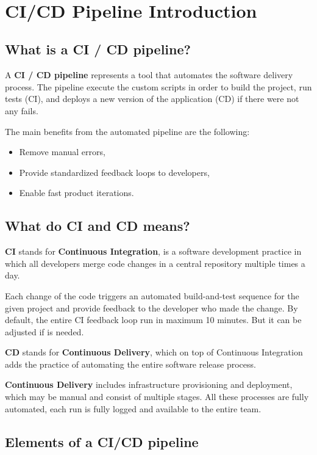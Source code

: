 \documentclass[12pt,a4paper,twoside]{article}
\begin{document}
~\newpage


\section{CI/CD Pipeline Introduction}


\subsection{What is a CI / CD pipeline?}


A \textbf{CI / CD pipeline} represents a tool that automates the software delivery process. The pipeline execute the custom scripts in order to build the project, run tests (CI), and deploys a new version of the application (CD) if there were not any fails.

The main benefits from the automated pipeline are the following:


\begin{itemize}
	\item Remove manual errors,
	\item Provide standardized feedback loops to developers,
	\item Enable fast product iterations.
\end{itemize}


\subsection{What do CI and CD means?}


\textbf{CI} stands for \textbf{Continuous Integration}, is a software development practice in which all developers merge code changes in a central repository multiple times a day.

Each change of the code triggers an automated build-and-test sequence for the given project and provide feedback to the developer who made the change. By default, the entire CI feedback loop run in maximum 10 minutes. But it can be adjusted if is needed.


\textbf{CD} stands for \textbf{Continuous Delivery}, which on top of Continuous Integration adds the practice of automating the entire software release process.

\textbf{Continuous Delivery} includes infrastructure provisioning and deployment, which may be manual and consist of multiple stages. All these processes are fully automated, each run is fully logged and available to the entire team.


\subsection{Elements of a CI/CD pipeline}
\end{document}
